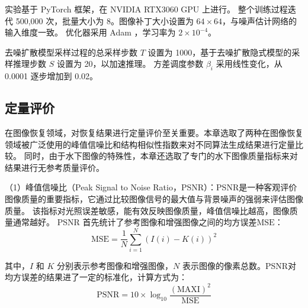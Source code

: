\begin{table}[ht]
	\vspace{-0.4mm}
	\centering
	\caption{\label{tab:dataset-split}数据集划分（成对图像）。}
	\vspace{-2mm}
	\vspace{-1mm}
\end{table}   

实验基于 PyTorch 框架，在 NVIDIA RTX3060 GPU 上进行。
整个训练过程迭代 500,000 次，批量大小为 8。图像补丁大小设置为 $64 \times 64$，与噪声估计网络的输入维度一致。
优化器采用 Adam \cite{kingma2017adam}，学习率为 $2 \times 10^{-4}$。

去噪扩散模型采样过程的总采样步数 $T$ 设置为 1000，基于去噪扩散隐式模型的采样推理步数 $S$ 设置为 20，以加速推理。
方差调度参数 $\beta_i$ 采用线性变化，从 0.0001 逐步增加到 0.02。

\subsection{定量评价} \label{sec:quantitative}
在图像恢复领域，对恢复结果进行定量评价至关重要。本章选取了两种在图像恢复领域被广泛使用的峰值信噪比和结构相似性指数来对不同算法生成结果进行定量比较。
同时，由于水下图像的特殊性，本章还选取了专门的水下图像质量指标来对结果进行无参考质量评价。

（1）峰值信噪比（Peak Signal to Noise Ratio，PSNR）：PSNR是一种客观评价图像质量的重要指标，它通过比较图像信号的最大值与背景噪声的强弱来评估图像质量。
该指标对光照误差敏感，能有效反映图像质量，峰值信噪比越高，图像质量通常越好。
PSNR 首先统计了参考图像和增强图像之间的均方误差$\mathrm{MSE}$：
\begin{equation}
    \mathrm{MSE} = \frac{1}{N} \sum_{i=1}^{N} (I(i) - K(i))^2
\end{equation}

其中，$I$ 和 $K$ 分别表示参考图像和增强图像，$N$ 表示图像的像素总数。PSNR对均方误差的结果进了一定的标准化，计算方式为：
\begin{equation}
    \mathrm{PSNR} =10 \times \log _{10} \frac{(\mathrm{MAXI})^2}{\mathrm{MSE}}
\end{equation}


